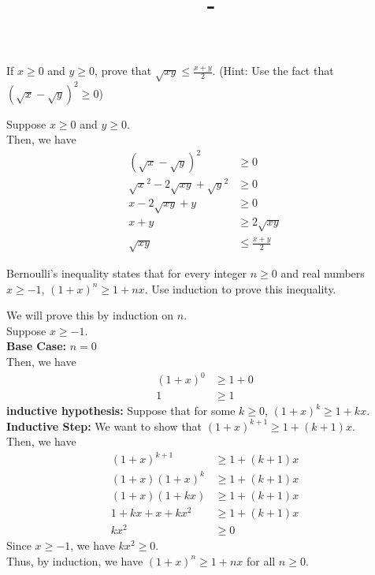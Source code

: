\documentclass[answers,12pt,addpoints]{exam}
\author{\name}
\title{\course \ - \assignment}
\begin{document}
\maketitle


\newpage
\begin{questions}
    \question If $x \geq 0$ and $y \geq 0$, prove that $\sqrt{xy} \leq \frac{x+y}{2}$. (Hint: Use the fact that $(\sqrt{x} - \sqrt{y})^2 \geq 0$)
    \begin{solution}
        Suppose $x \geq 0$ and $y \geq 0$. \\
        Then, we have
        \begin{align*}
            (\sqrt{x} - \sqrt{y})^2 &\geq 0 \\
            \sqrt{x}^2 - 2\sqrt{xy} + \sqrt{y}^2 &\geq 0 \\
            x - 2\sqrt{xy} + y &\geq 0 \\
            x + y &\geq 2\sqrt{xy}\\
            \sqrt{xy} &\leq \frac{x+y}{2}
        \end{align*}
    \end{solution}
    \question Bernoulli’s inequality states that for every integer $n \geq 0$ and real numbers $x \geq -1$, $(1 + x)^n \geq 1 + nx$. Use induction to prove this inequality.
    \begin{solution}
        We will prove this by induction on $n$. \\
        Suppose $x \geq -1$. \\
        \textbf{Base Case:} $n = 0$ \\
        Then, we have
        \begin{align*}
            (1 + x)^0 &\geq 1 + 0 \\
            1 &\geq 1
        \end{align*}
        \textbf{inductive hypothesis:} Suppose that for some $k \geq 0$, $(1 + x)^k \geq 1 + kx$. \\
        \textbf{Inductive Step:} We want to show that $(1 + x)^{k+1} \geq 1 + (k+1)x$. \\
        Then, we have
        \begin{align*}
            (1 + x)^{k+1} &\geq 1 + (k+1)x \\
            (1 + x)(1 + x)^k &\geq 1 + (k+1)x \\
            (1 + x)(1 + kx) &\geq 1 + (k+1)x \\
            1 + kx + x + kx^2 &\geq 1 + (k+1)x \\
            kx^2 &\geq 0
        \end{align*}
        Since $x \geq -1$, we have $kx^2 \geq 0$. \\
        Thus, by induction, we have $(1 + x)^n \geq 1 + nx$ for all $n \geq 0$.
    \end{solution}


\end{questions}
\end{document}
